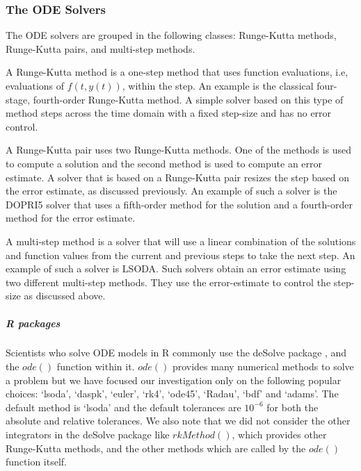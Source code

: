 \subsubsection{The ODE Solvers}
\label{subsection:numerical_software_used}
The ODE solvers are grouped in the following classes: Runge-Kutta methods, Runge-Kutta pairs, and multi-step methods.

A Runge-Kutta method is a one-step method that uses function evaluations, i.e, evaluations of $f(t, y(t))$, within the step. An example is the classical four-stage, fourth-order Runge-Kutta method. A simple solver based on this type of method steps across the time domain with a fixed step-size and has no error control.

A Runge-Kutta pair uses two Runge-Kutta methods. One of the methods is used to compute a solution and the second method is used to compute an error estimate. A solver that is based on a Runge-Kutta pair resizes the step based on the error estimate, as discussed previously. An example of such a solver is the DOPRI5 solver that uses a fifth-order method for the solution and a fourth-order method for the error estimate.

A multi-step method is a solver that will use a linear combination of the solutions and function values from the current and previous steps to take the next step. An example of such a solver is LSODA. Such solvers obtain an error estimate using two different multi-step methods. They use the error-estimate to control the step-size as discussed above.

\subparagraph{R packages}
Scientists who solve ODE models in R commonly use the deSolve package \cite{soetaert2010solving}, and the $ode()$ function within it.
$ode()$ provides many numerical methods to solve a problem but we have focused our investigation only on the following popular choices: `lsoda', `daspk', `euler', `rk4', `ode45', `Radau', `bdf' and `adams'. The default method is `lsoda' and the default tolerances are $10^{-6}$ for both the absolute and relative tolerances. We also note that we did not consider the other integrators in the deSolve package like $rkMethod()$, which provides other Runge-Kutta methods, and the other methods which are called by the $ode()$ function itself.

